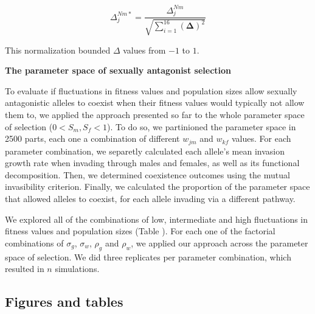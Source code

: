 \documentclass[]{article}
\begin{document}
\begin{equation}
  \Delta^{Nm*}_{j}= \frac{\Delta^{Nm}_{j}}{\sqrt{
    \sum\limits_{i=1}^{16} (\boldsymbol{\Delta})^{2} }}
\end{equation}

This normalization bounded $\Delta$ values from $-1$ to $1$.

\vspace{5mm}
\noindent\textbf{The parameter space of sexually antagonist selection}

To evaluate if fluctuations in fitness values and population sizes allow sexually antagonistic alleles to coexist when their fitness values would typically not allow them to, we applied the approach presented so far to the whole parameter space of selection  ($ 0 < S_{m}, S_{f} < 1$). To do so, we partinioned the parameter space in 2500 parts, each one a combination of different $w_{jm}$ and $w_{kf}$ values. For each parameter combination, we  separetly calculated each allele's mean invasion growth rate when invading through males and females, as well as its functional decomposition. Then, we determined coexistence outcomes using the mutual invasibility criterion. Finally, we calculated the proportion of the parameter space that allowed alleles to coexist, for each allele invading via a different pathway.

We explored all of  the combinations of low, intermediate and high fluctuations in fitness values and population sizes (Table ). For each one of the factorial combinations of $\sigma_{g}$, $\sigma_{w}$, $\rho_{g}$ and $\rho_{w}$, we applied our approach across the parameter space of selection. We did three replicates per parameter combination, which resulted in $n$ simulations.



\clearpage
\subsection*{Figures and tables }
\end{document}
